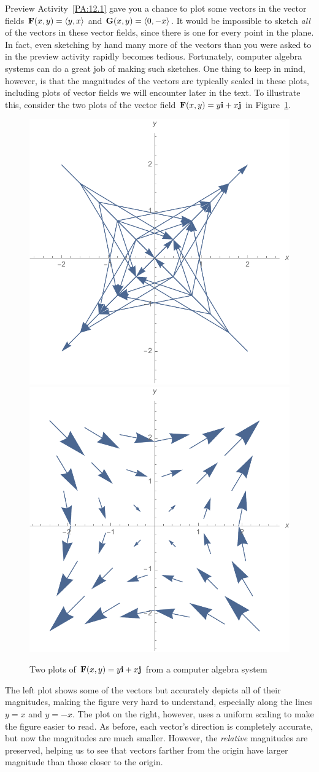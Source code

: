 Preview Activity~\ref{PA:12.1} gave you a chance to plot some vectors
in the vector fields $\mathbf{F}(x,y) = \langle y,x\rangle$ and $\mathbf{G}(x,y) =
\langle 0,-x\rangle$. It would be impossible to sketch \emph{all} of
the vectors in these vector fields, since there is one for every point
in the plane. In fact, even sketching by hand many more of the vectors
than you were asked to in the preview activity rapidly becomes
tedious. Fortunately, computer algebra systems can do a great job of
making such sketches. One thing to keep in mind, however, is that the
magnitudes of the vectors are typically scaled in these plots,
including plots of vector fields we will encounter later in the
text. To illustrate this, consider the two plots of the vector field
$\mathbf{F}(x,y) = y\mathbf{i} + x\mathbf{j}$ in Figure~\ref{fig:12.1.scale-field}. 
\begin{figure}[h]
  \centering
  \includegraphics[width=0.3\linewidth]{figures/12_1_vecfield_unscaled.pdf}\hspace{0.2\linewidth}  \includegraphics[width=0.3\linewidth]{figures/12_1_vecfield_scaled.pdf}
  \caption{Two plots of $\mathbf{F}(x,y) = y\mathbf{i} + x\mathbf{j}$ from a computer
    algebra system}
  \label{fig:12.1.scale-field}
\end{figure}
The left plot shows some of the vectors but accurately depicts all of
their magnitudes, making the figure very hard to understand,
especially along the lines $y=x$ and $y=-x$. The plot on the right,
however, uses a uniform scaling to make the figure easier to read. As
before, each vector's direction is completely accurate, but now the
magnitudes are much smaller. However, the \emph{relative} magnitudes
are preserved, helping us to see that vectors farther from the origin
have larger magnitude than those closer to the origin.


